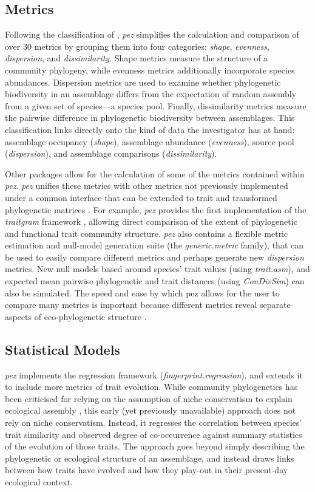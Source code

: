 \documentclass{bioinfo}
\begin{document}
\subsection{Metrics}
Following the classification of \citet{Pearse2014review}, \emph{pez}
simplifies the calculation and comparison of over 30 metrics by
grouping them into four categories: \emph{shape}, \emph{evenness},
\emph{dispersion}, and \emph{dissimilarity}. Shape metrics measure the
structure of a community phylogeny, while evenness metrics
additionally incorporate species abundances. Dispersion metrics are
used to examine whether phylogenetic biodiversity in an assemblage
differs from the expectation of random assembly from a given set of
species---a species pool. Finally, dissimilarity metrics measure the
pairwise difference in phylogenetic biodiversity between
assemblages. This classification links directly onto the kind of data
the investigator has at hand: assemblage occupancy (\emph{shape}),
assemblage abundance (\emph{evenness}), source pool
(\emph{dispersion}), and assemblage comparisons
(\emph{dissimilarity}).

Other packages \citep[notably \emph{picante};][]{Kembel2010} allow for
the calculation of some of the metrics contained within
\emph{pez}. \emph{pez} unifies these metrics with other metrics not
previously implemented under a common interface that can be extended
to trait and transformed phylogenetic matrices
\citep[\emph{sensu}][]{Letten2014}. For example, \emph{pez} provides
the first implementation of the \emph{traitgram} framework
\citep{Ackerly2009,Cadotte2013}, allowing direct comparison of the
extent of phylogenetic and functional trait community
structure. \emph{pez} also contains a flexible metric estimation and
null-model generation suite (the \emph{generic.metric} family), that
can be used to easily compare different metrics and perhaps generate
new \emph{dispersion} metrics. New null models based around species'
trait values (using \emph{trait.asm}), and expected mean pairwise
phylogenetic and trait distances (using \emph{ConDivSim}) can also be
simulated. The speed and ease by which pez allows for the user to
compare many metrics is important because different metrics reveal
separate aspects of eco-phylogenetic structure \citep{Cadotte2010}.
\subsection{Statistical Models}
\emph{pez} implements the \citet{Cavender-Bares2004} regression
framework (\emph{fingerprint.regression}), and extends it to include
more metrics of trait evolution. While community phylogenetics has
been criticised for relying on the assumption of niche conservatism to
explain ecological assembly \citep[\emph{e.g.},][]{Mayfield2010}, this
early (yet previously unavailable) approach does not rely on niche
conservatism. Instead, it regresses the correlation between species'
trait similarity and observed degree of co-occurrence against summary
statistics of the evolution of those traits. The approach goes beyond
simply describing the phylogenetic or ecological structure of an
assemblage, and instead draws links between how traits have evolved
and how they play-out in their present-day ecological context.
\end{document}
